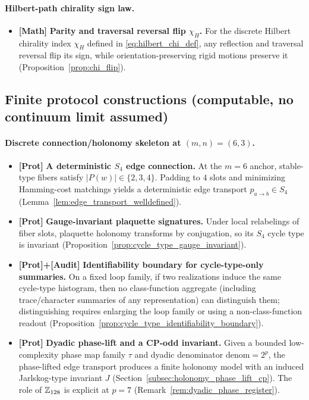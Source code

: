 \paragraph{Hilbert-path chirality sign law.}
\begin{itemize}
\item \textbf{[Math]} \textbf{Parity and traversal reversal flip $\chi_H$.}
For the discrete Hilbert chirality index $\chi_H$ defined in \eqref{eq:hilbert_chi_def}, any reflection and traversal reversal flip its sign, while orientation-preserving rigid motions preserve it (Proposition~\ref{prop:chi_flip}).
\end{itemize}

\subsection{Finite protocol constructions (computable, no continuum limit assumed)}
\paragraph{Discrete connection/holonomy skeleton at \texorpdfstring{$(m,n)=(6,3)$}{(m,n)=(6,3)}.}
\begin{itemize}
\item \textbf{[Prot]} \textbf{A deterministic $S_4$ edge connection.}
At the $m=6$ anchor, stable-type fibers satisfy $|P(w)|\in\{2,3,4\}$.
Padding to $4$ slots and minimizing Hamming-cost matchings yields a deterministic edge transport $p_{a\to b}\in S_4$ (Lemma~\ref{lem:edge_transport_welldefined}).
\item \textbf{[Prot]} \textbf{Gauge-invariant plaquette signatures.}
Under local relabelings of fiber slots, plaquette holonomy transforms by conjugation, so its $S_4$ cycle type is invariant (Proposition~\ref{prop:cycle_type_gauge_invariant}).
\item \textbf{[Prot]+[Audit]} \textbf{Identifiability boundary for cycle-type-only summaries.}
On a fixed loop family, if two realizations induce the same cycle-type histogram, then no class-function aggregate (including trace/character summaries of any representation) can distinguish them; distinguishing requires enlarging the loop family or using a non-class-function readout (Proposition~\ref{prop:cycle_type_identifiability_boundary}).
\item \textbf{[Prot]} \textbf{Dyadic phase-lift and a CP-odd invariant.}
Given a bounded low-complexity phase map family $\tau$ and dyadic denominator $\mathrm{denom}=2^p$, the phase-lifted edge transport produces a finite holonomy model with an induced Jarlskog-type invariant $J$ (Section~\ref{subsec:holonomy_phase_lift_cp}).
The role of $\mathbb{Z}_{128}$ is explicit at $p=7$ (Remark~\ref{rem:dyadic_phase_register}).
\end{itemize}

